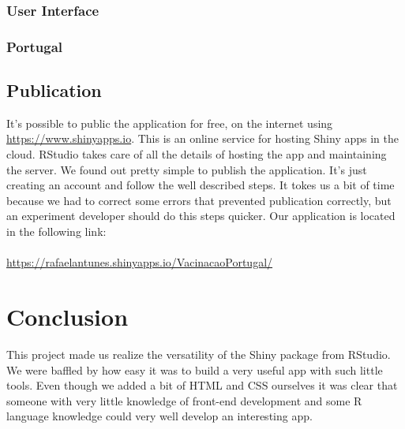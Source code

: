 \documentclass[11pt,a4paper]{report}
\begin{document}
\subsection{User Interface}


\subsection{Portugal}




\section{Publication}
It's possible to public the application for free, on the internet using \url{https://www.shinyapps.io}. \cite{io} This is an online service for hosting Shiny apps in the cloud. RStudio takes care of all the details of hosting the app and maintaining the server.
We found out pretty simple to publish the application. It's just creating an account and follow the well described steps. It tokes us a bit of time because we had to correct some errors that prevented publication correctly, but an experiment developer should do this steps quicker. Our application is located in the following link:\\
\\
\href{https://rafaelantunes.shinyapps.io/VacinacaoPortugal/}{https://rafaelantunes.shinyapps.io/VacinacaoPortugal/}

\chapter{Conclusion}

This project made us realize the versatility of the Shiny package from RStudio. We were baffled by how easy it was to build a very useful app with such little tools. Even though we added a bit of HTML and CSS ourselves it was clear that someone with very little knowledge of front-end development and some R language knowledge could very well develop an interesting app.
\end{document}
